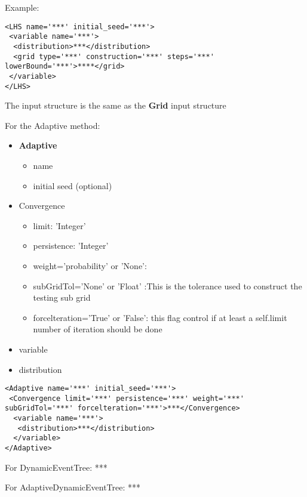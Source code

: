 Example:
\begin{lstlisting}[style=XML]
<LHS name='***' initial_seed='***'> 
 <variable name='***'>  
  <distribution>***</distribution> 	
  <grid	type='***' construction='***' steps='***' lowerBound='***'>****</grid>   
 </variable> 
</LHS> 
\end{lstlisting}
The input structure is the same as the \textbf{Grid} input structure

For the Adaptive method:
\begin{itemize}
\item \textbf{Adaptive}
\begin{itemize}
\item name
\item initial seed (optional)
\end{itemize}
\item Convergence
\begin{itemize}
\item limit: 'Integer'
\item persistence: 'Integer'
\item weight='probability' or 'None': 
\item subGridTol='None' or 'Float' :This is the tolerance used to construct the testing sub grid
\item forcelteration='True' or 'False': this flag control if at least a self.limit number of iteration should be done
\end{itemize}
\item variable
\item distribution
\end{itemize}

\begin{lstlisting}[style=XML]
<Adaptive name='***' initial_seed='***'> 
 <Convergence limit='***' persistence='***' weight='***' subGridTol='***' forcelteration='***'>***</Convergence>  
  <variable name='***'>
   <distribution>***</distribution>
  </variable> 
</Adaptive>   
\end{lstlisting}



For DynamicEventTree:
***

For AdaptiveDynamicEventTree:
***


























